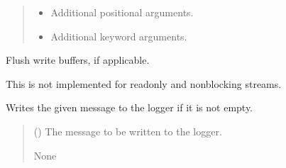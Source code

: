 \documentclass[a4paper,11pt,english,openany]{sphinxmanual}
\begin{document}
\begin{fulllineitems}
\begin{fulllineitems}
\begin{quote}
\begin{description}
\begin{itemize}
\item {} 
\sphinxAtStartPar
{} \textendash{} Additional positional arguments.

\item {} 
\sphinxAtStartPar
{} \textendash{} Additional keyword arguments.

\end{itemize}

\end{description}\end{quote}

\end{fulllineitems}


\begin{fulllineitems}
\label{\detokenize{api/spyice.utils.spyice_logger:spyice.utils.spyice_logger.SpyiceLogger.flush}}
\pysigstartsignatures
{}
\pysigstopsignatures
\sphinxAtStartPar
Flush write buffers, if applicable.

\sphinxAtStartPar
This is not implemented for read\sphinxhyphen{}only and non\sphinxhyphen{}blocking streams.

\end{fulllineitems}


\begin{fulllineitems}
\label{\detokenize{api/spyice.utils.spyice_logger:spyice.utils.spyice_logger.SpyiceLogger.write}}
\pysigstartsignatures
{}
\pysigstopsignatures
\sphinxAtStartPar
Writes the given message to the logger if it is not empty.
\begin{quote}\begin{description}
\sphinxAtStartPar
{} () \textendash{} The message to be written to the logger.

\sphinxAtStartPar
None

\end{description}\end{quote}

\end{fulllineitems}


\end{fulllineitems}
\end{document}
